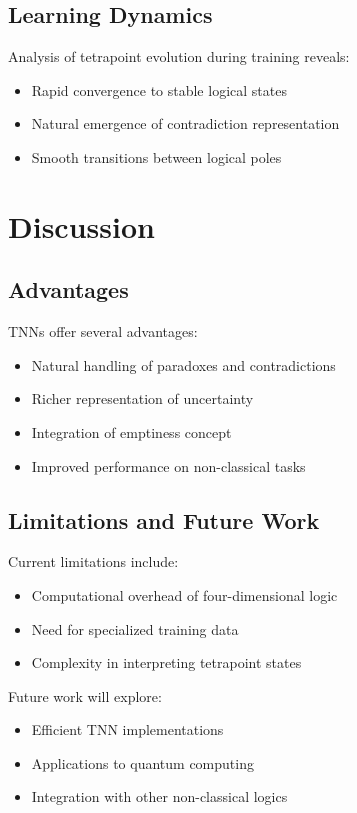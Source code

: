 \documentclass[10pt,journal,compsoc]{IEEEtran}
\begin{document}
\subsection{Learning Dynamics}
Analysis of tetrapoint evolution during training reveals:
\begin{itemize}
\item Rapid convergence to stable logical states
\item Natural emergence of contradiction representation
\item Smooth transitions between logical poles
\end{itemize}

\section{Discussion}
\subsection{Advantages}
TNNs offer several advantages:
\begin{itemize}
\item Natural handling of paradoxes and contradictions
\item Richer representation of uncertainty
\item Integration of emptiness concept
\item Improved performance on non-classical tasks
\end{itemize}

\subsection{Limitations and Future Work}
Current limitations include:
\begin{itemize}
\item Computational overhead of four-dimensional logic
\item Need for specialized training data
\item Complexity in interpreting tetrapoint states
\end{itemize}

Future work will explore:
\begin{itemize}
\item Efficient TNN implementations
\item Applications to quantum computing
\item Integration with other non-classical logics
\end{itemize}
\end{document}
